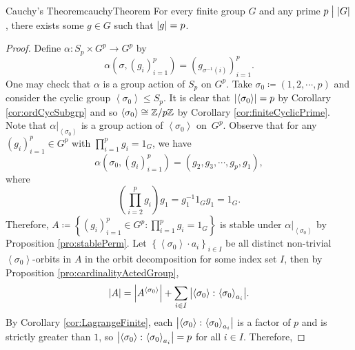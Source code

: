 \documentclass[math]{amznotes}
\theoremstyle{remark}
\newcommand{\0}{\mathbf{0}}
\newcommand{\1}{\mathbf{1}}
\begin{document}
\begin{thmbox}{Cauchy's Theorem}{cauchyTheorem}
    For every finite group $G$ and any prime $p \bigm\vert {\left\lvert {G} \right\rvert}$, there exists some $g \in G$ such that ${\left\lvert {g} \right\rvert} = p$.
    \tcblower
    \begin{proof}
        Define $\alpha \colon S_p \times G^p \to G^p$ by 
        \begin{equation*}
            \alpha\left(\sigma, \left(g_i\right)_{i = 1}^p\right) = \left(g_{\sigma^{-1}\left(i\right)}\right)_{i = 1}^p.
        \end{equation*}
        One may check that $\alpha$ is a group action of $S_p$ on $G^p$. Take $\sigma_0 \coloneqq \left(1, 2, \cdots, p\right)$ and consider the cyclic group $\left\langle\sigma_0\right\rangle \leq S_p$. It is clear that ${\left\lvert {\left\langle\sigma_0\right\rangle} \right\rvert} = p$ by Corollary \ref{cor:ordCycSubgrp} and so  $\left\langle\sigma_0\right\rangle \cong \mathbb{Z} \slash p\mathbb{Z}$ by Corollary \ref{cor:finiteCyclicPrime}. Note that $\left.\alpha\right\vert_{\left\langle\sigma_0\right\rangle}$ is a group action of $\left\langle\sigma_0\right\rangle$ on~$G^p$. Observe that for any $\left(g_i\right)_{i = 1}^p \in G^p$ with $\prod_{i = 1}^{p}g_i = 1_G$, we have 
        \begin{equation*}
            \alpha\left(\sigma_0, \left(g_i\right)_{i = 1}^p\right) = \left(g_2, g_3, \cdots, g_p, g_1\right),
        \end{equation*}
        where 
        \begin{equation*}
            \left(\prod_{i = 2}^{p}g_i\right)g_1 = g_1^{-1}1_Gg_1 = 1_G.
        \end{equation*}
        Therefore, $A \coloneqq \left\{\left(g_i\right)_{i = 1}^p \in G^p \colon \prod_{i = 1}^{p}g_i = 1_G\right\}$ is stable under $\left.\alpha\right\rvert_{\left\langle\sigma_0\right\rangle}$ by Proposition \ref{pro:stablePerm}. Let $\left\{\left\langle\sigma_0\right\rangle \cdot a_i\right\}_{i \in I}$ be all distinct non-trivial $\left\langle\sigma_0\right\rangle$-orbits in $A$ in the orbit decomposition for some index set $I$, then by Proposition \ref{pro:cardinalityActedGroup}, 
        \begin{equation*}
            {\left\lvert {A} \right\rvert} = {\left\lvert {A^{\left\langle\sigma_0\right\rangle}} \right\rvert} + \sum_{i \in I}{\left\lvert {\left\langle\sigma_0\right\rangle \colon {\left\langle\sigma_0\right\rangle}_{a_i}} \right\rvert}.
        \end{equation*}
        By Corollary \ref{cor:LagrangeFinite}, each ${\left\lvert {\left\langle\sigma_0\right\rangle \colon {\left\langle\sigma_0\right\rangle}_{a_i}} \right\rvert}$ is a factor of $p$ and is strictly greater than $1$, so ${\left\lvert {\left\langle\sigma_0\right\rangle \colon {\left\langle\sigma_0\right\rangle}_{a_i}} \right\rvert} = p$ for all $i \in I$. Therefore, 

\end{proof}
\end{thmbox}
\end{document}
